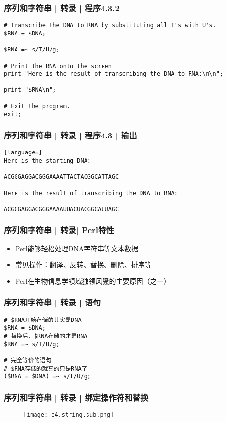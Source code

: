 \begin{frame}[fragile,label=exam4.3.2]
  \frametitle{序列和字符串 | 转录 | 程序4.3.2}
\begin{lstlisting}[firstnumber=12]
# Transcribe the DNA to RNA by substituting all T's with U's.
$RNA = $DNA;

$RNA =~ s/T/U/g;

# Print the RNA onto the screen
print "Here is the result of transcribing the DNA to RNA:\n\n";

print "$RNA\n";

# Exit the program.
exit;
\end{lstlisting}
\end{frame}

\begin{frame}[fragile]
  \frametitle{序列和字符串 | 转录 | 程序4.3 | 输出}
\begin{lstlisting}[language=]
Here is the starting DNA:

ACGGGAGGACGGGAAAATTACTACGGCATTAGC

Here is the result of transcribing the DNA to RNA:

ACGGGAGGACGGGAAAAUUACUACGGCAUUAGC
\end{lstlisting}
\end{frame}

\begin{frame}
  \frametitle{序列和字符串 | 转录| Perl特性}
  \begin{itemize}
    \item Perl能够轻松处理DNA字符串等文本数据
    \item 常见操作：翻译、反转、替换、删除、排序等
    \item Perl在生物信息学领域独领风骚的主要原因（之一）
  \end{itemize}
\end{frame}

\begin{frame}[fragile]
  \frametitle{序列和字符串 | 转录 | \alert{语句}}
\begin{lstlisting}
# $RNA开始存储的其实是DNA
$RNA = $DNA;
# 替换后，$RNA存储的才是RNA
$RNA =~ s/T/U/g;

# 完全等价的语句
# $RNA存储的就真的只是RNA了
($RNA = $DNA) =~ s/T/U/g;
\end{lstlisting}
\end{frame}

\begin{frame}
  \frametitle{序列和字符串 | 转录 | \alert{绑定操作符和替换}}
  \begin{figure}
    \centering
    \texttt{[image: c4.string.sub.png]}
  \end{figure}
\end{frame}

